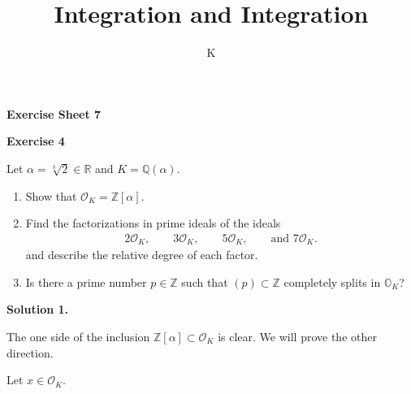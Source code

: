 \documentclass[a4paper]{article}
\title{Integration and Integration}
\author{K}
\theoremstyle{definition}
\begin{document}
\begin{center}
    \noindent\textbf{Exercise Sheet 7}
\end{center}
\noindent\textbf{Exercise 4}

\noindent Let \(\alpha = \sqrt[3]{2} \in \mathbb{R}\) and \(K = \mathbb{Q}(\alpha)\).

\begin{enumerate}
    \item Show that \(\mathcal{O}_K = \mathbb{Z}[\alpha]\).
    \item Find the factorizations in prime ideals of the ideals
    \begin{align}
        2 \mathcal{O}_K, \qquad 3 \mathcal{O}_K, \qquad 5 \mathcal{O}_K, \qquad \text{and } 7 \mathcal{O}_K \text{.}
    \end{align}
    and describe the relative degree of each factor.
    \item Is there a prime number \(p \in \mathbb{Z}\) such that \((p) \subset \mathbb{Z}\) completely splits in \(\mathbb{O}_K\)?
\end{enumerate}

\noindent\textbf{Solution 1.}

The one side of the inclusion \(\mathbb{Z}[\alpha] \subset \mathcal{O}_K\) is clear. We will prove the other direction.

Let \(x \in \mathcal{O}_K\). 
\end{document}
